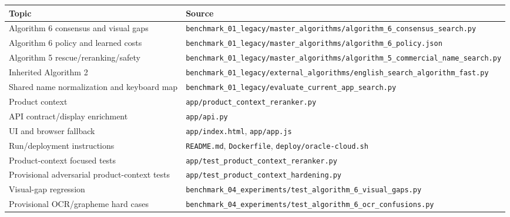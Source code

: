 {\def\LTcaptype{none} %
\begin{longtable}[]{@{}>{\RaggedRight\arraybackslash}p{.27\linewidth}>{\RaggedRight\arraybackslash}p{.66\linewidth}@{}}
\toprule\noalign{}
Topic & Source \\
\midrule\noalign{}
\endhead
\bottomrule\noalign{}
\endlastfoot
Algorithm 6 consensus and visual gaps & \texttt{benchmark\_\allowbreak{}01\_\allowbreak{}legacy/master\_\allowbreak{}algorithms/algorithm\_\allowbreak{}6\_\allowbreak{}consensus\_\allowbreak{}search.py} \\
Algorithm 6 policy and learned costs & \texttt{benchmark\_\allowbreak{}01\_\allowbreak{}legacy/master\_\allowbreak{}algorithms/algorithm\_\allowbreak{}6\_\allowbreak{}policy.json} \\
Algorithm 5 rescue/reranking/safety & \texttt{benchmark\_\allowbreak{}01\_\allowbreak{}legacy/master\_\allowbreak{}algorithms/algorithm\_\allowbreak{}5\_\allowbreak{}commercial\_\allowbreak{}name\_\allowbreak{}search.py} \\
Inherited Algorithm 2 & \texttt{benchmark\_\allowbreak{}01\_\allowbreak{}legacy/external\_\allowbreak{}algorithms/english\_\allowbreak{}search\_\allowbreak{}algorithm\_\allowbreak{}fast.py} \\
Shared name normalization and keyboard map & \texttt{benchmark\_\allowbreak{}01\_\allowbreak{}legacy/evaluate\_\allowbreak{}current\_\allowbreak{}app\_\allowbreak{}search.py} \\
Product context & \texttt{app/product\_\allowbreak{}context\_\allowbreak{}reranker.py} \\
API contract/display enrichment & \texttt{app/api.py} \\
UI and browser fallback & \texttt{app/index.html}, \texttt{app/app.js} \\
Run/deployment instructions & \texttt{README.md}, \texttt{Dockerfile}, \texttt{deploy/oracle-cloud.sh} \\
Product-context focused tests & \texttt{app/test\_\allowbreak{}product\_\allowbreak{}context\_\allowbreak{}reranker.py} \\
Provisional adversarial product-context tests & \texttt{app/test\_\allowbreak{}product\_\allowbreak{}context\_\allowbreak{}hardening.py} \\
Visual-gap regression & \texttt{benchmark\_\allowbreak{}04\_\allowbreak{}experiments/test\_\allowbreak{}algorithm\_\allowbreak{}6\_\allowbreak{}visual\_\allowbreak{}gaps.py} \\
Provisional OCR/grapheme hard cases & \texttt{benchmark\_\allowbreak{}04\_\allowbreak{}experiments/test\_\allowbreak{}algorithm\_\allowbreak{}6\_\allowbreak{}ocr\_\allowbreak{}confusions.py} \\

\end{longtable}}
